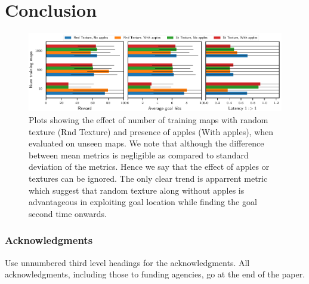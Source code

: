 \documentclass{article} %
\begin{document}
\section{Conclusion}


\begin{figure}%
  \includegraphics[width=\linewidth]{images/plot_ntrain_summary.pdf}%
  \vspace{-1em}%
  \caption{Plots showing the effect of number of training maps with random texture (Rnd Texture) and presence of apples (With apples), when evaluated on unseen maps. We note that although the difference between mean metrics is negligible as compared to standard deviation of the metrics. Hence we say that the effect of apples or textures can be ignored.
  The only clear trend is apparrent \LatencyOneGtOne{} metric which suggest that random texture along without apples is advantageous in exploiting goal location while finding the goal second time onwards.}
  \label{fig:num-training-maps}
\end{figure}

\subsubsection*{Acknowledgments}

Use unnumbered third level headings for the acknowledgments. All
acknowledgments, including those to funding agencies, go at the end of the paper.


\end{document}
